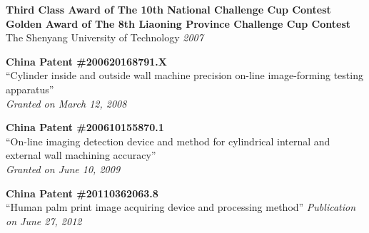 \documentclass[9pt]{article}
\newenvironment{changemargin}[2]{%
  \begin{list}{}{%
    \setlength{\topsep}{0pt}%
    \setlength{\leftmargin}{#1}%
    \setlength{\rightmargin}{#2}%
    \setlength{\listparindent}{\parindent}%
    \setlength{\itemindent}{\parindent}%
    \setlength{\parsep}{\parskip}%
  }%
  \item[]}{\end{list}
}
\newenvironment{body} {
	\vspace*{-16pt}
	\begin{changemargin}{-0.25in}{-0.5in}
  }	
	{\end{changemargin}
}
\begin{document}
\begin{body}
	\vspace{14pt}
	
    \textbf{Third Class Award of The 10th National Challenge Cup Contest\\
    Golden Award of The 8th Liaoning Province Challenge Cup Contest}\\
    The Shenyang University of Technology \hfill{} \emph{2007}\\
	
    \medskip
    
    \textbf{China Patent \#200620168791.X}\\
    ``Cylinder inside and outside wall machine precision on-line image-forming testing apparatus''\\
    \hfill{} \emph{Granted on March 12, 2008} \\ 
    
    \medskip
	
    \textbf{China Patent \#200610155870.1}\\
    ``On-line imaging detection device and method for cylindrical internal and external wall machining accuracy''\\
    \hfill{} \emph{Granted on June 10, 2009}\\
	
    \medskip
    
    \textbf{China Patent \#20110362063.8}\\
    ``Human palm print image acquiring device and processing method'' \hfill{} \emph{Publication on June 27, 2012}

\end{body}
\end{document}
